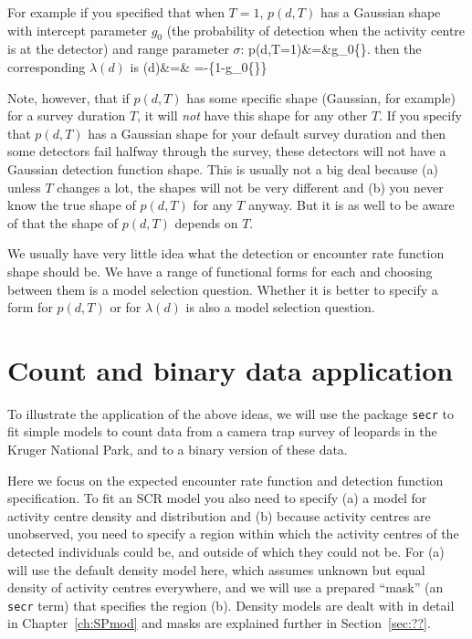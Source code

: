 For example if you specified that when $T=1$, $p(d,T)$ has a Gaussian shape with intercept parameter $g_0$ (the probability of detection when the activity centre is at the detector) and range parameter $\sigma$:
\be
p(d,T=1)&=&g_0\exp\left\{\right\}.
\label{eq:ER+detfun.p.hn}
\ee
\noindent
then the corresponding $\lambda(d)$ is
\be
\lambda(d)&=&
\;=\;-\log\left\{1-g_0\exp\left\{\right\}\right\}
\label{eq:ER+detfun.Guassian.p.to.lambda}
\ee

Note, however, that if $p(d,T)$ has some specific shape (Gaussian, for example) for a survey duration $T$, it will \textit{not} have this shape for any other $T$. If you specify that $p(d,T)$ has a Gaussian shape for your default survey duration and then some detectors fail halfway through the survey, these detectors will not have a Gaussian detection function shape. This is usually not a big deal because (a) unless $T$ changes a lot, the shapes will not be very different and (b) you never know the true shape of $p(d,T)$ for any $T$ anyway. But it is as well to be aware of that the shape of $p(d,T)$ depends on $T$.

We usually have very little idea what the detection or encounter rate function shape should be. We have a range of functional forms for each and choosing between them is a model selection question. Whether it is better to specify a form for $p(d,T)$ or for $\lambda(d)$ is also a model selection question. 


\section{Count and binary data application}
\label{sec:ER+detfun.count+binary.eg}

To illustrate the application of the above ideas, we will use the package \texttt{secr} to fit simple models to count data from a camera trap survey of leopards in the Kruger National Park, and to a binary version of these data.

Here we focus on the expected encounter rate function and detection function specification. To fit an SCR model you also need to specify (a) a model for activity centre density and distribution and (b) because activity centres are unobserved, you need to specify a region within which the activity centres of the detected individuals could be, and outside of which they could not be. For (a) will use the default density model here, which assumes unknown but equal density of activity centres everywhere, and we will use a prepared ``mask'' (an \texttt{secr} term) that specifies the region (b). Density models are dealt with in detail in Chapter~\ref{ch:SPmod} and masks are explained further in Section~\ref{sec:??}.

